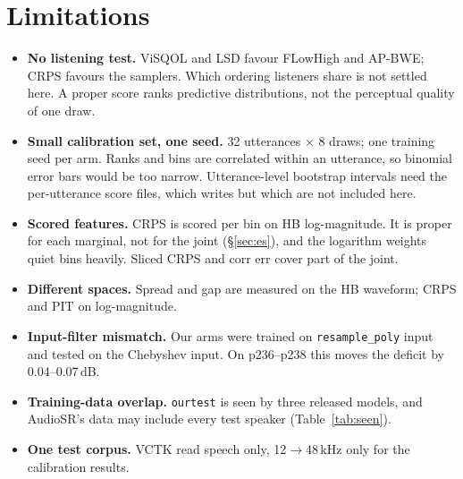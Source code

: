 \documentclass[10pt,letterpaper]{article}
\newcommand{\file}[1]{\path{#1}}
\begin{document}
\section{Limitations}\label{sec:limits}
\begin{itemize}
\item \textbf{No listening test.} ViSQOL and LSD favour FLowHigh and AP-BWE; CRPS favours the samplers. Which
ordering listeners share is not settled here. A proper score ranks predictive distributions, not the
perceptual quality of one draw.
\item \textbf{Small calibration set, one seed.} 32 utterances $\times$ 8 draws; one training seed per arm.
Ranks and bins are correlated within an utterance, so binomial error bars would be too narrow. Utterance-level
bootstrap intervals need the per-utterance score files, which \file{score.py} writes but which are not
included here.
\item \textbf{Scored features.} CRPS is scored per bin on HB log-magnitude. It is proper for each marginal,
not for the joint (\S\ref{sec:es}), and the logarithm weights quiet bins heavily. Sliced CRPS and corr err
cover part of the joint.
\item \textbf{Different spaces.} Spread and gap are measured on the HB waveform; CRPS and PIT on log-magnitude.
\item \textbf{Input-filter mismatch.} Our arms were trained on \texttt{resample\_poly} input and tested on the
Chebyshev input. On p236--p238 this moves the deficit by 0.04--0.07\,dB.
\item \textbf{Training-data overlap.} \texttt{ourtest} is seen by three released models, and AudioSR's data may
include every test speaker (Table~\ref{tab:seen}).
\item \textbf{One test corpus.} VCTK read speech only, 12$\to$48\,kHz only for the calibration results.
\end{itemize}

\end{document}
